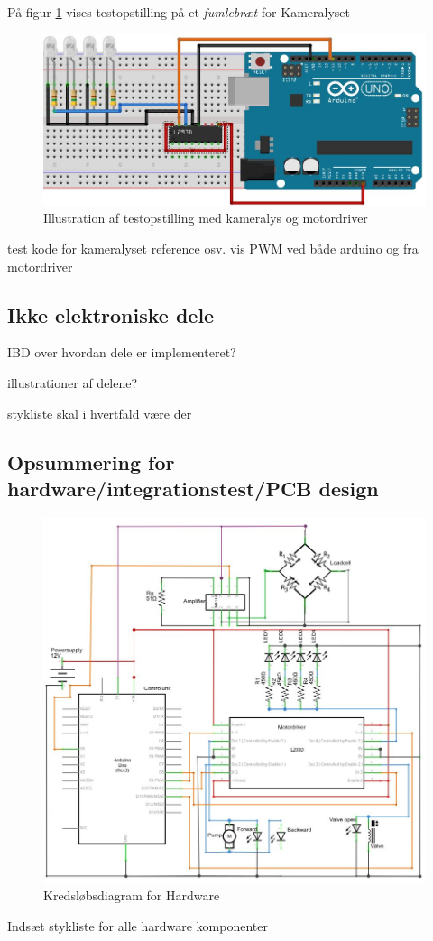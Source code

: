 På figur \ref{fig:LEDbreadboard} vises testopstilling på et \textit{fumlebræt} for Kameralyset

\begin{figure}[H]
	\centering
	\includegraphics[width=1\textwidth]{billeder/Hardware/diagrammer/LEDbreadboard.JPG}
	\caption{Illustration af testopstilling med kameralys og motordriver}
	\label{fig:LEDbreadboard}
\end{figure}

 test kode for kameralyset reference osv.
 vis PWM ved både arduino og fra motordriver
 
 
 
\subsection{Ikke elektroniske dele}

IBD over hvordan dele er implementeret?

illustrationer af delene?

stykliste skal i hvertfald være der 
 
 
 
 
\subsection{Opsummering for hardware/integrationstest/PCB design} 

\begin{figure}[H]
	\centering
	\includegraphics[width=1\textwidth]{billeder/Hardware/diagrammer/HWdiagram.JPG}
	\caption{Kredsløbsdiagram for Hardware}
	\label{fig:HWdiagram}
\end{figure}

Indsæt stykliste for alle hardware komponenter
 